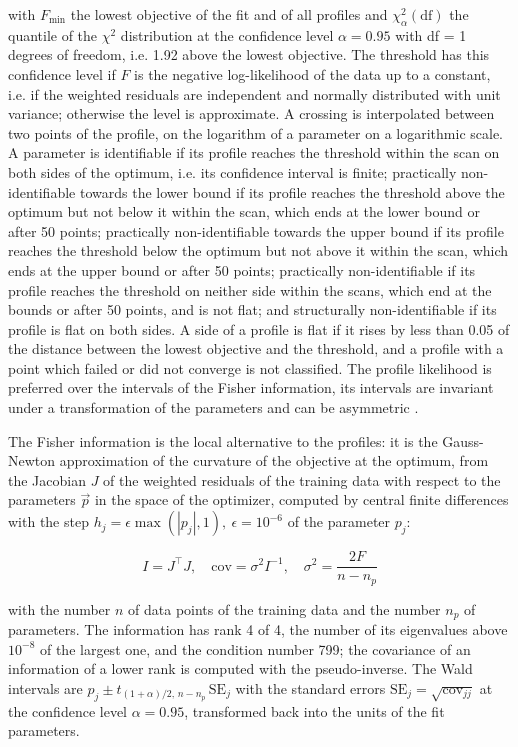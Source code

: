 with $F_{\min}$ the lowest objective of the fit and of all profiles and $\chi^2_{\alpha}(\mathrm{df})$ the quantile of the $\chi^2$ distribution at the confidence level $\alpha = 0.95$ with df = 1 degrees of freedom, i.e. 1.92 above the lowest objective. The threshold has this confidence level if $F$ is the negative log-likelihood of the data up to a constant, i.e. if the weighted residuals are independent and normally distributed with unit variance; otherwise the level is approximate. A crossing is interpolated between two points of the profile, on the logarithm of a parameter on a logarithmic scale. A parameter is identifiable if its profile reaches the threshold within the scan on both sides of the optimum, i.e. its confidence interval is finite; practically non-identifiable towards the lower bound if its profile reaches the threshold above the optimum but not below it within the scan, which ends at the lower bound or after 50 points; practically non-identifiable towards the upper bound if its profile reaches the threshold below the optimum but not above it within the scan, which ends at the upper bound or after 50 points; practically non-identifiable if its profile reaches the threshold on neither side within the scans, which end at the bounds or after 50 points, and is not flat; and structurally non-identifiable if its profile is flat on both sides. A side of a profile is flat if it rises by less than 0.05 of the distance between the lowest objective and the threshold, and a profile with a point which failed or did not converge is not classified. The profile likelihood is preferred over the intervals of the Fisher information, its intervals are invariant under a transformation of the parameters and can be asymmetric \cite{Wieland2021}.

The Fisher information is the local alternative to the profiles: it is the Gauss-Newton approximation of the curvature of the objective at the optimum, from the Jacobian $J$ of the weighted residuals of the training data with respect to the parameters $\vec{p}$ in the space of the optimizer, computed by central finite differences with the step $h_j = \epsilon \max(|p_j|, 1),\ \epsilon = 10^{-6}$ of the parameter $p_j$:

\begin{equation}
I = J^\top J, \quad \mathrm{cov} = \sigma^2 I^{-1}, \quad \sigma^2 = \frac{2 F}{n - n_p}
\end{equation}

with the number $n$ of data points of the training data and the number $n_p$ of parameters. The information has rank 4 of 4, the number of its eigenvalues above $10^{-8}$ of the largest one, and the condition number 799; the covariance of an information of a lower rank is computed with the pseudo-inverse. The Wald intervals are $\hat{p}_j \pm t_{(1+\alpha)/2,\, n-n_p}\, \mathrm{SE}_j$ with the standard errors $\mathrm{SE}_j = \sqrt{\mathrm{cov}_{jj}}$ at the confidence level $\alpha = 0.95$, transformed back into the units of the fit parameters.

